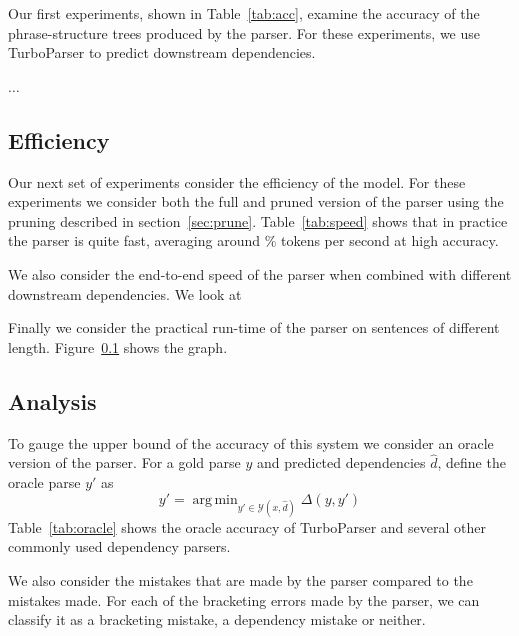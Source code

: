 \documentclass[11pt,letterpaper]{article}
\DeclareMathOperator*{\argmin}{arg\,min}
\begin{document}
Our first experiments, shown in Table~\ref{tab:acc}, examine the accuracy of the phrase-structure trees produced by the parser. For these experiments,
we use TurboParser \cite{martins2013turning} to predict downstream dependencies.

$\ldots$


\subsection{Efficiency}

Our next set of experiments consider the efficiency of the model. For these experiments we consider both the full and pruned version of the parser using the pruning described in section~\ref{sec:prune}. Table~\ref{tab:speed} shows that in practice the parser is quite fast,  averaging around \% tokens per second at high accuracy.

We also consider the end-to-end speed of the parser when combined with different downstream dependencies. We look at

Finally we consider the practical run-time of the parser on sentences of different length. Figure~\ref{} shows the graph.


\subsection{Analysis}
\label{sec:analysis}

To gauge the upper bound of the accuracy of this system we consider an oracle version of the parser. For a gold parse $y$ and predicted dependencies $\hat{d}$,  define the oracle parse $y'$ as
\[ y' = \argmin_{y' \in \mathcal{Y}(x, \hat{d})} \Delta(y, y') \]
\noindent Table~\ref{tab:oracle} shows the oracle accuracy of TurboParser and several other commonly used dependency parsers.

We also consider the mistakes that are made by the parser compared to the
mistakes made. For each of the bracketing errors made by the parser, we can classify it as a bracketing mistake, a dependency mistake or neither.
\end{document}
